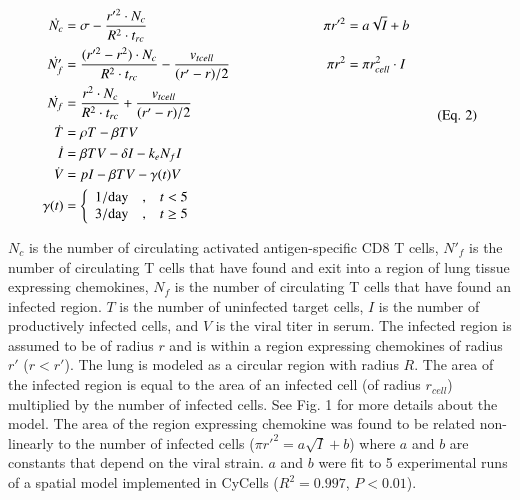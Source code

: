 \documentclass[preprint,10pt,numbers]{elsarticle}
\newcommand{\removed}[1]{}
\newcommand{\new}[1]{#1}
\begin{document}
{\footnotesize
\begin{equation*}
\label{eq:miao}
\begin{aligned}
\dot{N_{c}} &= \sigma - \frac{r'^{2} \cdot N_{c}}{R^{2} \cdot t_{rc}} & \pi r'^{2} &= a \sqrt{I} + b \\
\dot{N'_{f}} &= \frac{(r'^{2} - r^{2}) \cdot N_{c}}{R^{2} \cdot t_{rc}} - \frac{v_{tcell}}{(r' - r) / 2} \hspace*{2cm}  & \pi r^{2} &= \pi r_{cell}^{2} \cdot I \\
\dot{N_{f}} &= \frac{r^{2} \cdot N_{c}}{R^{2} \cdot t_{rc}} + \frac{v_{tcell}}{(r' - r) / 2} \\
\dot{T} &= \rho T -\beta TV \\
\dot{I} &= \beta TV - \delta I - k_{e} N_{f} I \\
\dot{V} &= pI - \beta TV - \gamma (t) V \\
\gamma (t) &= \left\{ \begin{array}{rcl}
	1/\mbox{day} & \mbox{,}  & t < 5  \\
	3/\mbox{day} & \mbox{,} & t \geq 5  
	\end{array}\right. \\
\end{aligned}
\tag{Eq. 2}
\end{equation*}
}
\vspace{0.5in}


$N_{c}$ is the number of circulating activated antigen-specific CD8 T cells, $N'_{f}$ is the number of circulating T cells that have found and exit into a region of lung tissue expressing chemokines, $N_{f}$ is the number of circulating T cells that have found an infected region. $T$ is the number of uninfected target cells, $I$ is the number of productively infected cells, and $V$ is the viral titer in serum. The infected region is assumed to be of radius $r$ and is within a region expressing chemokines of radius $r'$ ($r  < r'$). The lung is modeled as a circular region with radius $R$. The area of the infected region is equal to the area of an infected cell (of radius $r_{cell}$) multiplied by the number of infected cells. See Fig. 1 for more details about the model.  The area of the region expressing chemokine was found to be related non-linearly to the number of infected cells ($\pi r'^{2} = a \sqrt{I} + b$) where $a$ and $b$ are constants that depend on the viral strain.  $a$ and $b$ were fit \removed{using 12}\new{to 5} experimental runs of a spatial model implemented in CyCells \new{($R^2 = 0.997$, $P < 0.01$)}.
\end{document}

